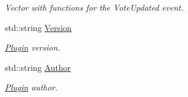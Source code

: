 \begin{DoxyCompactItemize}
\begin{DoxyCompactList}\small\item\em Vector with functions for the Vote\-Updated event. \end{DoxyCompactList}\item 
\hypertarget{classPlugin_a8e332303a494988d2444589ac21c3414}{std\-::string \hyperlink{classPlugin_a8e332303a494988d2444589ac21c3414}{Version}}\label{classPlugin_a8e332303a494988d2444589ac21c3414}

\begin{DoxyCompactList}\small\item\em \hyperlink{classPlugin}{Plugin} version. \end{DoxyCompactList}\item 
\hypertarget{classPlugin_a2b51c785a131a581164f2c82e83cb660}{std\-::string \hyperlink{classPlugin_a2b51c785a131a581164f2c82e83cb660}{Author}}\label{classPlugin_a2b51c785a131a581164f2c82e83cb660}

\begin{DoxyCompactList}\small\item\em \hyperlink{classPlugin}{Plugin} author. \end{DoxyCompactList}\end{DoxyCompactItemize}

